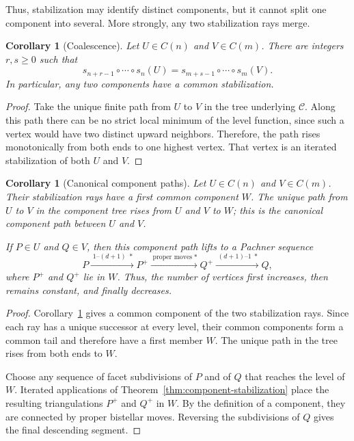 \documentclass[11pt]{article}
\newtheorem{corollary}[theorem]{Corollary}
\theoremstyle{remark}
\theoremstyle{plain}
\begin{document}
Thus, stabilization may identify distinct components, but it cannot split one
component into several.  More strongly, any two stabilization rays merge.

\begin{corollary}[Coalescence]
\label{cor:coalescence}
Let \(U\in C(n)\) and \(V\in C(m)\).  There are integers \(r,s\ge0\) such
that
\[
 s_{n+r-1}\circ\cdots\circ s_n(U)
 =
 s_{m+s-1}\circ\cdots\circ s_m(V).
\]
In particular, any two components have a common stabilization.
\end{corollary}

\begin{proof}
Take the unique finite path from \(U\) to \(V\) in the tree underlying
\(\mathcal C\).  Along this path there can be no strict local minimum of the
level function, since such a vertex would have two distinct upward neighbors.
Therefore, the path rises monotonically from both ends to one highest vertex.
That vertex is an iterated stabilization of both \(U\) and \(V\).
\end{proof}

\begin{corollary}[Canonical component paths]
\label{cor:canonical-path}
Let \(U\in C(n)\) and \(V\in C(m)\).  Their stabilization rays have a first
common component \(W\).  The unique path from \(U\) to \(V\) in the
component tree rises from \(U\) and \(V\) to \(W\); this is the
\emph{canonical component path} between \(U\) and \(V\).

If \(P\in U\) and \(Q\in V\), then this component path lifts to a Pachner
sequence
\[
 P
 \xrightarrow{\;1\text{--}(d+1)\;*}
 P^+
 \xrightarrow{\;\text{proper moves}\;*}
 Q^+
 \xrightarrow{\;(d+1)\text{--}1\;*}
 Q,
\]
where \(P^+\) and \(Q^+\) lie in \(W\).  Thus, the number of vertices first
increases, then remains constant, and finally decreases.
\end{corollary}

\begin{proof}
Corollary~\ref{cor:coalescence} gives a common component of the two
stabilization rays.  Since each ray has a unique successor at every level,
their common components form a common tail and therefore have a first member
\(W\).  The unique path in the tree rises from both ends to \(W\).

Choose any sequence of facet subdivisions of \(P\) and of \(Q\) that reaches
the level of \(W\).  Iterated applications of
Theorem~\ref{thm:component-stabilization} place the resulting triangulations
\(P^+\) and \(Q^+\) in \(W\).  By the definition of a component, they are
connected by proper bistellar moves.  Reversing the subdivisions of \(Q\)
gives the final descending segment.
\end{proof}
\end{document}
